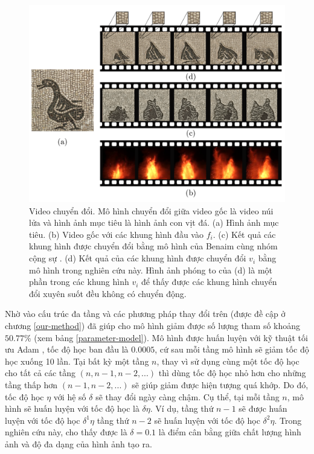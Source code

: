 \documentclass[12pt]{report}%
\begin{document}
\begin{figure}[t]
\vspace{-0.5cm}
	\centering
	\includegraphics[width=1\textwidth]{img/result.pdf}
	\caption[Video chuyển đổi]{\blindtext Video chuyển đổi. \quad Mô hình chuyển đổi giữa video gốc là video núi lửa và hình ảnh mục tiêu là hình ảnh con vịt đá. (a) Hình ảnh mục tiêu. (b) Video gốc với các khung hình đầu vào $f_i$. (c)  Kết quả các khung hình được chuyển đổi bằng mô hình của Benaim cùng nhóm cộng sự \cite{benaim2020structuralanalogy}. (d) Kết quả của các khung hình được chuyển đổi $v_i$ bằng mô hình trong nghiên cứu này. Hình ảnh phóng to của (d) là một phần trong các khung hình $v_i$ để thấy được các khung hình chuyển đổi xuyên suốt đều không có chuyển động.}
	\label{fig:result} \vspace{-0.4cm}
\end{figure}
Nhờ vào cấu trúc đa tầng và các phương pháp thay đổi trên (được đề cập ở chương \ref{our-method}) đã giúp cho mô hình giảm được số lượng tham số  khoảng $50.77\%$ (xem bảng \ref{parameter-model}). Mô hình được huấn luyện với kỹ thuật tối ưu  Adam \cite{kingma2014adam}, tốc độ học ban đầu là $0.0005$, cứ sau mỗi tầng mô hình sẽ giảm tốc độ học xuống 10 lần. Tại bất kỳ một tầng $n$,  thay vì  sử dụng cùng một tốc độ học cho tất cả các tầng $\left( n, n-1, n -2, ... \right)$ thì dùng tốc độ học nhỏ hơn cho những tầng thấp hơn  $\left(  n-1, n -2, ... \right)$ sẽ giúp giảm được hiện tượng quá khớp. Do đó,  tốc độ học $\eta$ với hệ số $\delta$ sẽ thay đổi ngày càng chậm. Cụ thể, tại mỗi tầng $n$, mô hình sẽ huấn luyện với tốc độ học là ${\delta}\eta $. Ví dụ, tầng thứ $n-1$ sẽ được huấn luyện với tốc độ học ${\delta ^1}\eta $ tầng thứ $n-2$ sẽ huấn luyện với tốc độ học ${\delta ^2}\eta $. Trong nghiên cứu này, cho thấy được là $\delta  = 0.1$ là điểm cân bằng giữa chất lượng hình ảnh và độ đa dạng của hình ảnh tạo ra.
\end{document}
